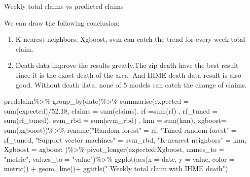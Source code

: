 \documentclass[
]{article}
\newenvironment{Shaded}{\begin{snugshade}}{\end{snugshade}}
\newcommand{\AttributeTok}[1]{\textcolor[rgb]{0.77,0.63,0.00}{#1}}
\newcommand{\FloatTok}[1]{\textcolor[rgb]{0.00,0.00,0.81}{#1}}
\newcommand{\FunctionTok}[1]{\textcolor[rgb]{0.00,0.00,0.00}{#1}}
\newcommand{\NormalTok}[1]{#1}
\newcommand{\OtherTok}[1]{\textcolor[rgb]{0.56,0.35,0.01}{#1}}
\newcommand{\SpecialCharTok}[1]{\textcolor[rgb]{0.00,0.00,0.00}{#1}}
\newcommand{\StringTok}[1]{\textcolor[rgb]{0.31,0.60,0.02}{#1}}
\begin{document}
Weekly total claims vs predicted claims

We can draw the following conclusion:

\begin{enumerate}
\def\labelenumi{\arabic{enumi}.}
\item
  K-nearest neighbors, Xgboost, svm can catch the trend for every week
  total claim.
\item
  Death data improve the results greatly.The zip death have the best
  result since it is the exact death of the area. And IHME death data
  result is also good. Without death data, none of 5 models can catch
  the change of claims.
\end{enumerate}

\begin{Shaded}
\begin{Highlighting}[]
\NormalTok{predclaim}\SpecialCharTok{\%\textgreater{}\%}
  \FunctionTok{group\_by}\NormalTok{(date)}\SpecialCharTok{\%\textgreater{}\%}
  \FunctionTok{summarise}\NormalTok{(}\AttributeTok{expected =} \FunctionTok{sum}\NormalTok{(expected)}\SpecialCharTok{/}\FloatTok{52.18}\NormalTok{,}
        \AttributeTok{claims =} \FunctionTok{sum}\NormalTok{(claims),}
          \AttributeTok{rf =}\FunctionTok{sum}\NormalTok{(rf) ,}
         \AttributeTok{rf\_tuned =} \FunctionTok{sum}\NormalTok{(rf\_tuned),}
         \AttributeTok{svm\_rbd =} \FunctionTok{sum}\NormalTok{(svm\_rbd) ,}
         \AttributeTok{knn =} \FunctionTok{sum}\NormalTok{(knn),}
         \AttributeTok{xgboost=} \FunctionTok{sum}\NormalTok{(xgboost))}\SpecialCharTok{\%\textgreater{}\%}
   \FunctionTok{rename}\NormalTok{(}\StringTok{"Random forest"} \OtherTok{=}\NormalTok{ rf, }\StringTok{"Tuned random forest"} \OtherTok{=}\NormalTok{ rf\_tuned, }
    \StringTok{"Support vector machines"} \OtherTok{=}\NormalTok{ svm\_rbd, }\StringTok{"K{-}nearest neighbors"} \OtherTok{=}\NormalTok{ knn, }\AttributeTok{Xgboost =}\NormalTok{ xgboost )}\SpecialCharTok{\%\textgreater{}\%}
  \FunctionTok{pivot\_longer}\NormalTok{(expected}\SpecialCharTok{:}\NormalTok{Xgboost, }\AttributeTok{names\_to =} \StringTok{"metric"}\NormalTok{, }\AttributeTok{values\_to =} \StringTok{"value"}\NormalTok{)}\SpecialCharTok{\%\textgreater{}\%}
  \FunctionTok{ggplot}\NormalTok{(}\FunctionTok{aes}\NormalTok{(}\AttributeTok{x =}\NormalTok{ date, }\AttributeTok{y =}\NormalTok{ value, }\AttributeTok{color =}\NormalTok{ metric)) }\SpecialCharTok{+} \FunctionTok{geom\_line}\NormalTok{()}\SpecialCharTok{+}
  \FunctionTok{ggtitle}\NormalTok{(}\StringTok{" Weekly total claim with IHME death"}\NormalTok{)}
\end{Highlighting}
\end{Shaded}
\end{document}
